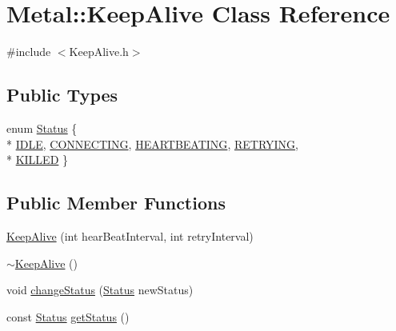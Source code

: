 \hypertarget{classMetal_1_1KeepAlive}{}\section{Metal\+:\+:Keep\+Alive Class Reference}
\label{classMetal_1_1KeepAlive}


{\ttfamily \#include $<$Keep\+Alive.\+h$>$}

\subsection*{Public Types}
\begin{DoxyCompactItemize}
\item 
enum \hyperlink{classMetal_1_1KeepAlive_ac47e726ea693a76d0779c0bf29ee7038}{Status} \{ \\*
\hyperlink{classMetal_1_1KeepAlive_ac47e726ea693a76d0779c0bf29ee7038a0ab6be78225116671e556638503ab303}{I\+D\+L\+E}, 
\hyperlink{classMetal_1_1KeepAlive_ac47e726ea693a76d0779c0bf29ee7038a285081598416837c9850eb58102a58b0}{C\+O\+N\+N\+E\+C\+T\+I\+N\+G}, 
\hyperlink{classMetal_1_1KeepAlive_ac47e726ea693a76d0779c0bf29ee7038ac0d3ef69ef689828c5bb46fdd61aea5b}{H\+E\+A\+R\+T\+B\+E\+A\+T\+I\+N\+G}, 
\hyperlink{classMetal_1_1KeepAlive_ac47e726ea693a76d0779c0bf29ee7038ad1a1538e89dac841fe462074656bd930}{R\+E\+T\+R\+Y\+I\+N\+G}, 
\\*
\hyperlink{classMetal_1_1KeepAlive_ac47e726ea693a76d0779c0bf29ee7038a47defdafb4c082a8848645b806b8fb77}{K\+I\+L\+L\+E\+D}
 \}
\end{DoxyCompactItemize}
\subsection*{Public Member Functions}
\begin{DoxyCompactItemize}
\item 
\hyperlink{classMetal_1_1KeepAlive_a7cd53cadf8e84e855690c852f1f3d0c4}{Keep\+Alive} (int hear\+Beat\+Interval, int retry\+Interval)
\item 
\hyperlink{classMetal_1_1KeepAlive_a7eb713c179b8d4d472a31f75b7e5df49}{$\sim$\+Keep\+Alive} ()
\item 
void \hyperlink{classMetal_1_1KeepAlive_a3b499808ace15ca0c9935ebd3f8bf90a}{change\+Status} (\hyperlink{classMetal_1_1KeepAlive_ac47e726ea693a76d0779c0bf29ee7038}{Status} new\+Status)
\item 
const \hyperlink{classMetal_1_1KeepAlive_ac47e726ea693a76d0779c0bf29ee7038}{Status} \hyperlink{classMetal_1_1KeepAlive_aacfa8b8fae38445b67e7826d2ba98060}{get\+Status} ()
\end{DoxyCompactItemize}
